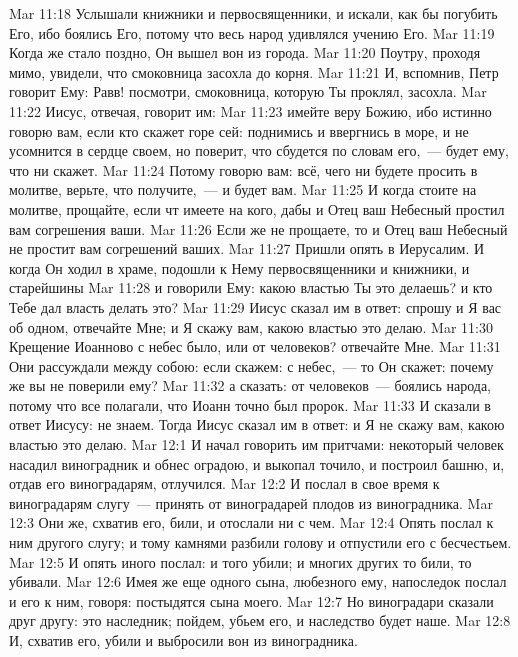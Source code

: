 \vs Mar 11:18 Услышали  книжники и первосвященники, и искали, как бы погубить Его, ибо боялись Его, потому что весь народ удивлялся учению Его.
\vs Mar 11:19 Когда же стало поздно, Он вышел вон из города.
\rsbpar\vs Mar 11:20 Поутру, проходя мимо, увидели, что смоковница засохла до корня.
\vs Mar 11:21 И, вспомнив, Петр говорит Ему: Равв! посмотри, смоковница, которую Ты проклял, засохла.
\vs Mar 11:22 Иисус, отвечая, говорит им:
\vs Mar 11:23 имейте веру Божию, ибо истинно говорю вам, если кто скажет горе сей: поднимись и ввергнись в море, и не усомнится в сердце своем, но поверит, что сбудется по словам его,~--- будет ему, что ни скажет.
\vs Mar 11:24 Потому говорю вам: всё, чего ни будете просить в молитве, верьте, что получите,~--- и будет вам.
\vs Mar 11:25 И когда стоите на молитве, прощайте, если чт имеете на кого, дабы и Отец ваш Небесный простил вам согрешения ваши.
\vs Mar 11:26 Если же не прощаете, то и Отец ваш Небесный не простит вам согрешений ваших.
\rsbpar\vs Mar 11:27 Пришли опять в Иерусалим. И когда Он ходил в храме, подошли к Нему первосвященники и книжники, и старейшины
\vs Mar 11:28 и говорили Ему: какою властью Ты это делаешь? и кто Тебе дал власть делать это?
\vs Mar 11:29 Иисус сказал им в ответ: спрошу и Я вас об одном, отвечайте Мне;  и Я скажу вам, какою властью это делаю.
\vs Mar 11:30 Крещение Иоанново с небес было, или от человеков? отвечайте Мне.
\vs Mar 11:31 Они рассуждали между собою: если скажем: с небес,~--- то Он скажет: почему же вы не поверили ему?
\vs Mar 11:32 а сказать: от человеков~--- боялись народа, потому что все полагали, что Иоанн точно был пророк.
\vs Mar 11:33 И сказали в ответ Иисусу: не знаем. Тогда Иисус сказал им в ответ: и Я не скажу вам, какою властью это делаю.
\vs Mar 12:1 И начал говорить им притчами: некоторый человек насадил виноградник и обнес оградою, и выкопал точило, и построил башню, и, отдав его виноградарям, отлучился.
\vs Mar 12:2 И послал в свое время к виноградарям слугу~--- принять от виноградарей плодов из виноградника.
\vs Mar 12:3 Они же, схватив его, били, и отослали ни с чем.
\vs Mar 12:4 Опять послал к ним другого слугу; и тому камнями разбили голову и отпустили его с бесчестьем.
\vs Mar 12:5 И опять иного послал: и того убили; и многих других то били, то убивали.
\vs Mar 12:6 Имея же еще одного сына, любезного ему, напоследок послал и его к ним, говоря: постыдятся сына моего.
\vs Mar 12:7 Но виноградари сказали друг другу: это наследник; пойдем, убьем его, и наследство будет наше.
\vs Mar 12:8 И, схватив его, убили и выбросили вон из виноградника.
